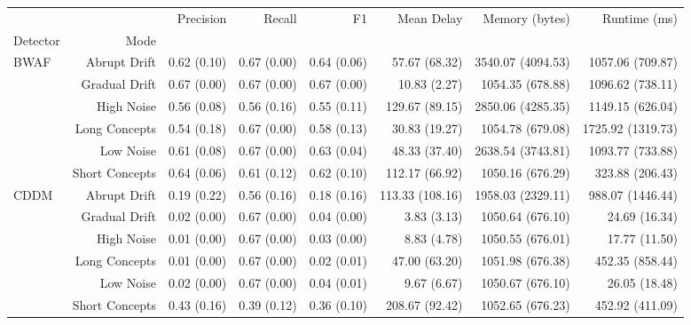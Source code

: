 \begin{tabular}{lrrrrrrr}
\toprule
     &                &    Precision &       Recall &           F1 &       Mean Delay &             Memory (bytes) &            Runtime (ms) \\
Detector & Mode &              &              &              &                  &                    &                    \\
\midrule
BWAF & Abrupt Drift &  0.62 (0.10) &  0.67 (0.00) &  0.64 (0.06) &    57.67 (68.32) &  3540.07 (4094.53) &   1057.06 (709.87) \\
     & Gradual Drift &  0.67 (0.00) &  0.67 (0.00) &  0.67 (0.00) &     10.83 (2.27) &   1054.35 (678.88) &   1096.62 (738.11) \\
     & High Noise &  0.56 (0.08) &  0.56 (0.16) &  0.55 (0.11) &   129.67 (89.15) &  2850.06 (4285.35) &   1149.15 (626.04) \\
     & Long Concepts &  0.54 (0.18) &  0.67 (0.00) &  0.58 (0.13) &    30.83 (19.27) &   1054.78 (679.08) &  1725.92 (1319.73) \\
     & Low Noise &  0.61 (0.08) &  0.67 (0.00) &  0.63 (0.04) &    48.33 (37.40) &  2638.54 (3743.81) &   1093.77 (733.88) \\
     & Short Concepts &  0.64 (0.06) &  0.61 (0.12) &  0.62 (0.10) &   112.17 (66.92) &   1050.16 (676.29) &    323.88 (206.43) \\
CDDM & Abrupt Drift &  0.19 (0.22) &  0.56 (0.16) &  0.18 (0.16) &  113.33 (108.16) &  1958.03 (2329.11) &   988.07 (1446.44) \\
     & Gradual Drift &  0.02 (0.00) &  0.67 (0.00) &  0.04 (0.00) &      3.83 (3.13) &   1050.64 (676.10) &      24.69 (16.34) \\
     & High Noise &  0.01 (0.00) &  0.67 (0.00) &  0.03 (0.00) &      8.83 (4.78) &   1050.55 (676.01) &      17.77 (11.50) \\
     & Long Concepts &  0.01 (0.00) &  0.67 (0.00) &  0.02 (0.01) &    47.00 (63.20) &   1051.98 (676.38) &    452.35 (858.44) \\
     & Low Noise &  0.02 (0.00) &  0.67 (0.00) &  0.04 (0.01) &      9.67 (6.67) &   1050.67 (676.10) &      26.05 (18.48) \\
     & Short Concepts &  0.43 (0.16) &  0.39 (0.12) &  0.36 (0.10) &   208.67 (92.42) &   1052.65 (676.23) &    452.92 (411.09) \\
\bottomrule
\end{tabular}
